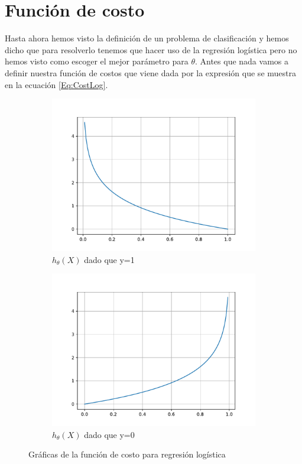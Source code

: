 \documentclass{report}
\begin{document}
\section{Función de costo}
Hasta ahora hemos visto la definición de un problema de clasificación y hemos dicho que para resolverlo tenemos que hacer uso de la regresión logística pero no hemos visto como escoger el mejor parámetro para $ \theta $. Antes que nada vamos a definir nuestra función de costos que viene dada por la expresión que se muestra en la ecuación \ref{Eq:CostLog}.
\begin{figure}[h]
	\begin{subfigure}{0.5\textwidth}
		\includegraphics[scale=0.5]{img/logy1}
		\caption{$h_\theta(X)$ dado que y=1}
		\label{Fig:logy1}
	\end{subfigure}
	\begin{subfigure}{0.5\textwidth}
		\includegraphics[scale=0.5]{img/logy2.pdf}
		\caption{$h_\theta(X)$ dado que y=0}
		\label{Fig:logy0}
	\end{subfigure}
	\caption{Gráficas de la función de costo para regresión logística}
\end{figure}
\end{document}
